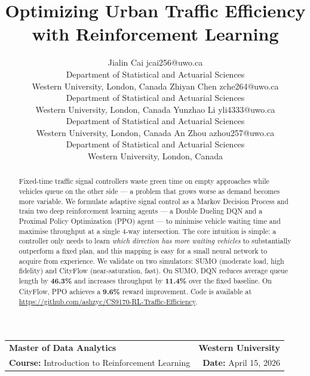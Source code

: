 \documentclass[twoside,11pt]{article}
\makeatletter
\newcommand{\reportheading}{
    \noindent
    \begin{tabular*}{\textwidth}{l @{\extracolsep{\fill}} r}
        \textbf{Master of Data Analytics} & \textbf{Western University} \\
        \textbf{Course:} Introduction to Reinforcement Learning & \textbf{Date:} April 15, 2026 \\
        \hline
    \end{tabular*}
    \vspace{0.5cm}
}
\makeatother
\begin{document}
\reportheading

\title{Optimizing Urban Traffic Efficiency with Reinforcement Learning}

\author{
\name Jialin Cai \email jcai256@uwo.ca \\
\addr Department of Statistical and Actuarial Sciences \\
Western University, London, Canada
\AND
\name Zhiyan Chen \email zche264@uwo.ca \\
\addr Department of Statistical and Actuarial Sciences \\
Western University, London, Canada
\AND
\name Yunzhao Li \email yli4333@uwo.ca \\
\addr Department of Statistical and Actuarial Sciences \\
Western University, London, Canada
\AND
\name An Zhou \email azhou257@uwo.ca \\
\addr Department of Statistical and Actuarial Sciences \\
Western University, London, Canada
}

\editor{}
\maketitle

\begin{abstract}
Fixed-time traffic signal controllers waste green time on empty approaches
while vehicles queue on the other side — a problem that grows worse as demand
becomes more variable.  We formulate adaptive signal control as a Markov
Decision Process and train two deep reinforcement learning agents — a Double
Dueling DQN and a Proximal Policy Optimization (PPO) agent — to minimise
vehicle waiting time and maximise throughput at a single 4-way intersection.
The core intuition is simple: a controller only needs to learn \emph{which
direction has more waiting vehicles} to substantially outperform a fixed plan,
and this mapping is easy for a small neural network to acquire from experience.
We validate on two simulators: SUMO (moderate load, high fidelity) and CityFlow
(near-saturation, fast).  On SUMO, DQN reduces average queue length by
\textbf{46.3\%} and increases throughput by \textbf{11.4\%} over the fixed
baseline.  On CityFlow, PPO achieves a \textbf{9.6\%} reward improvement.
Code is available at \url{https://github.com/ashzyc/CS9170-RL-Traffic-Efficiency}.
\end{abstract}
\end{document}
